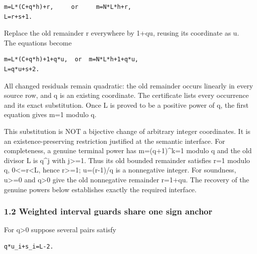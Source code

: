 \begin{verbatim}
m=L*(C+q*h)+r,     or     m=N*L*h+r,
L=r+s+1.
\end{verbatim}

Replace the old remainder r everywhere by 1+\allowbreak{}q\textasteriskcentered{}\allowbreak{}u, reusing its coordinate as u. The equations become



\begin{verbatim}
m=L*(C+q*h)+1+q*u,  or  m=N*L*h+1+q*u,
L=q*u+s+2.
\end{verbatim}

All changed residuals remain quadratic: the old remainder occurs linearly in every source row, and q is an existing coordinate. The certificate lists every occurrence and its exact substitution. Once L is proved to be a positive power of q, the first equation gives m=\allowbreak{}1 modulo q.



This substitution is NOT a bijective change of arbitrary integer coordinates. It is an existence-preserving restriction justified at the semantic interface. For completeness, a genuine terminal power has m=\allowbreak{}(q+\allowbreak{}1)\textasciicircum{}\allowbreak{}k=\allowbreak{}1 modulo q and the old divisor L is q\textasciicircum{}\allowbreak{}j with j\textgreater{}\allowbreak{}=\allowbreak{}1. Thus its old bounded remainder satisfies r=\allowbreak{}1 modulo q, 0\textless{}\allowbreak{}=\allowbreak{}r\textless{}\allowbreak{}L, hence r\textgreater{}\allowbreak{}=\allowbreak{}1; u=\allowbreak{}(r-1)/\allowbreak{}q is a nonnegative integer. For soundness, u\textgreater{}\allowbreak{}=\allowbreak{}0 and q\textgreater{}\allowbreak{}0 give the old nonnegative remainder r=\allowbreak{}1+\allowbreak{}q\textasteriskcentered{}\allowbreak{}u. The recovery of the genuine powers below establishes exactly the required interface.



\subsubsection*{1.2 Weighted interval guards share one sign anchor}



For q\textgreater{}\allowbreak{}0 suppose several pairs satisfy



\begin{verbatim}
q*u_i+s_i=L-2.
\end{verbatim}

